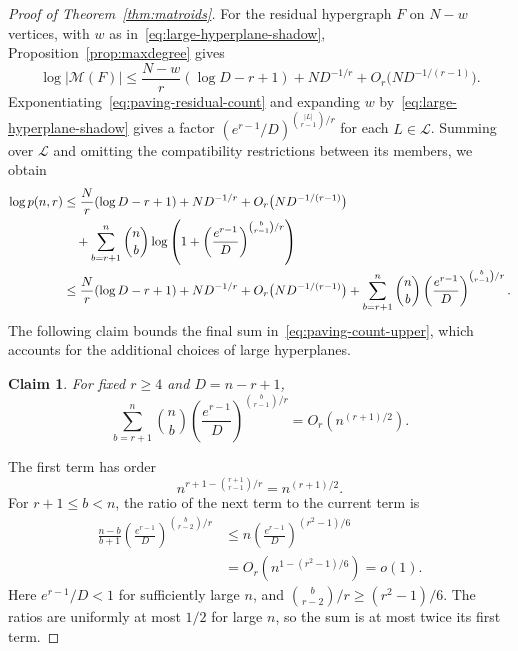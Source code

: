 \documentclass[11pt,reqno]{amsart}
\makeatletter
\numberwithin{equation}{section}
\theoremstyle{plain}
\newtheorem{claim}{Claim}[section]
\newenvironment{claimproof}[1][Proof]{\par
    \pushQED{\qed}%
    \renewcommand{\qedsymbol}{$\blacksquare$}
    \normalfont \topsep6\p@\@plus6\p@\relax
    \trivlist
    \item[\hskip\labelsep
    \textit{#1}\@addpunct{.}~]\ignorespaces
}{%
    \popQED\endtrivlist\@endpefalse
}
\theoremstyle{definition}
\newcommand{\calM}{\mathcal{M}}
\makeatother
\begin{document}
\begin{proof}[Proof of Theorem~\ref{thm:matroids}]
    For the residual hypergraph $F$ on $N-w$ vertices, with $w$ as in~\eqref{eq:large-hyperplane-shadow}, Proposition~\ref{prop:maxdegree} gives
    \begin{equation}\label{eq:paving-residual-count}
        \log|\calM(F)|\le\frac{N-w}{r}(\log D-r+1)
        +ND^{-1/r}+O_r\bigl(ND^{-1/(r-1)}\bigr).
    \end{equation}
    Exponentiating~\eqref{eq:paving-residual-count} and expanding $w$ by~\eqref{eq:large-hyperplane-shadow} gives a factor $(e^{r-1}/D)^{\binom{|L|}{r-1}/r}$ for each $L\in\mathcal L$.
    Summing over $\mathcal L$ and omitting the compatibility restrictions between its members, we obtain
    \begin{align}
        \log p(n,r)
        &\le\frac Nr(\log D-r+1)+ND^{-1/r}+O_r\bigl(ND^{-1/(r-1)}\bigr)\notag\\
        &\quad+\sum_{b=r+1}^{n}\binom nb
        \log\left(1+\left(\frac{e^{r-1}}D\right)^{\binom b{r-1}/r}\right)\notag\\
        &\le\frac Nr(\log D-r+1)+ND^{-1/r}+O_r\bigl(ND^{-1/(r-1)}\bigr)
        +\sum_{b=r+1}^{n}\binom nb\left(\frac{e^{r-1}}D\right)^{\binom b{r-1}/r}.
    \label{eq:paving-count-upper}
    \end{align}
    The following claim bounds the final sum in~\eqref{eq:paving-count-upper}, which accounts for the additional choices of large hyperplanes.
    \begin{claim}\label{clm:large-hyperplane-cost}
        For fixed $r\ge4$ and $D=n-r+1$,
        \[
            \sum_{b=r+1}^{n}\binom nb
            \left(\frac{e^{r-1}}D\right)^{\binom b{r-1}/r}
            =O_r(n^{(r+1)/2}).
        \]
    \end{claim}
    \begin{claimproof}[Proof of Claim~\ref{clm:large-hyperplane-cost}]
        The first term has order
        \[
            n^{r+1-\binom{r+1}{r-1}/r}=n^{(r+1)/2}.
        \]
        For $r+1\le b<n$, the ratio of the next term to the current term is
        \[
            \begin{aligned}
                \frac{n-b}{b+1}\left(\frac{e^{r-1}}D\right)^{\binom b{r-2}/r}
                &\le n\left(\frac{e^{r-1}}D\right)^{(r^2-1)/6}\\
                &=O_r(n^{1-(r^2-1)/6})=o(1).
            \end{aligned}
        \]
        Here $e^{r-1}/D<1$ for sufficiently large $n$, and $\binom b{r-2}/r\ge(r^2-1)/6$.
        The ratios are uniformly at most $1/2$ for large $n$, so the sum is at most twice its first term.
    \end{claimproof}


\end{proof}
\end{document}
